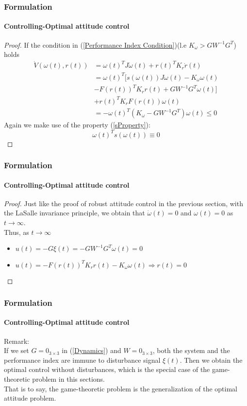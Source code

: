 \documentclass{beamer}
\begin{document}
\begin{frame}
\frametitle{Formulation}
\framesubtitle{Controlling-Optimal attitude control}
\begin{proof}
	If the condition in (\ref{Performance Index Condition})(l.e $K_{\omega}>GW^{-1}G^{T}$) holds
	\begin{equation}
	\begin{split}
	\dot{V}({\omega}(t),r(t))&=\omega(t)^{T}J{\dot{\omega}(t)}+r(t)^{T}K_{r}\dot{r}(t)\\
	&=\omega(t)^{T}\biggl[s(\omega(t))J\omega(t)-K_{\omega}\omega(t)\\
	&-F(r(t))^{T}K_{r}r(t)+GW^{-1}G^{T}\omega(t)\biggr]\\
	&+r(t)^{T}K_{r}F(r(t))\omega(t)\\
	&=-\omega(t)^{T}(K_{\omega}-GW^{-1}G^{T})\omega(t)\leq 0
	\end{split}
	\end{equation}
	Again we make use of the property (\ref{sProperty}):$$\omega(t)^{T}s(\omega(t))\equiv 0$$
\end{proof}
\end{frame}

\begin{frame}
\frametitle{Formulation}
\framesubtitle{Controlling-Optimal attitude control}
\begin{proof}
	Just like the proof of robust attitude control in the previous section, with the LaSalle invariance principle, we obtain that $\dot{\omega}(t)=0$ and $\omega(t)=0$ as $t\to \infty$. \\
	Thus, as $t\to \infty$
	\begin{itemize}
	\item $u(t)=-G\xi(t)=-GW^{-1}G^{T}\omega(t)=0$
	\item $u(t)=-F(r(t))^{T}K_{r}r(t)-K_{\omega}\omega(t) \Rightarrow r(t)=0$
	\end{itemize}
\end{proof}
\end{frame}

\begin{frame}
\frametitle{Formulation}
\framesubtitle{Controlling-Optimal attitude control}
Remark:\\
If we set $G=0_{3\times 3}$ in (\ref{Dynamics}) and $W=0_{3\times 3}$, both the system and the performance index are immune to disturbance signal $\xi(t)$. Then we obtain the optimal control without disturbances, which is the special case of the game-theoretic problem in this sections. \\
That is to say, the game-theoretic problem is the generalization of the optimal attitude problem.
\end{frame}
\end{document}
